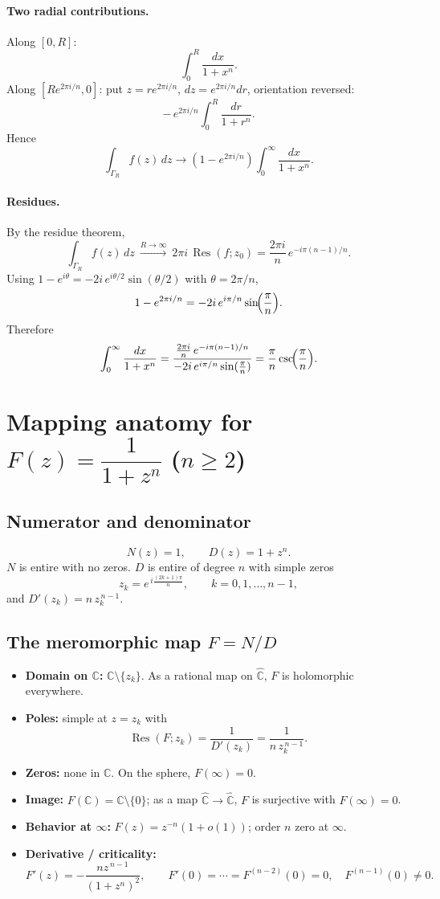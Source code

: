 \documentclass[12pt,a4paper]{article}
\newcommand{\C}{\mathbb{C}}
\begin{document}
\paragraph{Two radial contributions.}
Along \([0,R]\):
\[
\int_{0}^{R}\frac{dx}{1+x^{n}}.
\]
Along \([Re^{2\pi i/n},0]\): put \(z=re^{2\pi i/n}\), \(dz=e^{2\pi i/n}dr\), orientation reversed:
\[
-\,e^{2\pi i/n}\int_{0}^{R}\frac{dr}{1+r^{n}}.
\]
Hence
\[
\int_{\Gamma_R} f(z)\,dz
\longrightarrow (1-e^{2\pi i/n})\int_{0}^{\infty}\frac{dx}{1+x^{n}}.
\]

\paragraph{Residues.}
By the residue theorem,
\[
\int_{\Gamma_R} f(z)\,dz \ \xrightarrow{R\to\infty}\ 2\pi i\,\operatorname{Res}(f;z_0)
=\frac{2\pi i}{n}\,e^{-i\pi(n-1)/n}.
\]
Using \(1-e^{i\theta}=-2i\,e^{i\theta/2}\sin(\theta/2)\) with \(\theta=2\pi/n\),
\[
1-e^{2\pi i/n}=-2i\,e^{i\pi/n}\sin\!\Bigl(\frac{\pi}{n}\Bigr).
\]
Therefore
\[
\int_{0}^{\infty}\frac{dx}{1+x^{n}}
=\frac{ \frac{2\pi i}{n}\,e^{-i\pi(n-1)/n} }
{ -2i\,e^{i\pi/n}\sin(\frac{\pi}{n}) }
=\frac{\pi}{n}\csc\!\Bigl(\frac{\pi}{n}\Bigr).
\]

\section*{Mapping anatomy for \(F(z)=\dfrac{1}{1+z^{n}}\) (\(n\ge 2\))}

\subsection*{Numerator and denominator}
\[
N(z)=1,\qquad D(z)=1+z^{n}.
\]
\(N\) is entire with no zeros. \(D\) is entire of degree \(n\) with simple zeros
\[
z_k=e^{\,i\frac{(2k+1)\pi}{n}},\qquad k=0,1,\dots,n-1,
\]
and \(D'(z_k)=n\,z_k^{\,n-1}\).

\subsection*{The meromorphic map \(F=N/D\)}
\begin{itemize}
	\item \textbf{Domain on \(\C\):} \(\C\setminus\{z_k\}\). As a rational map on \(\widehat{\C}\), \(F\) is holomorphic everywhere.
	\item \textbf{Poles:} simple at \(z=z_k\) with
	\[
	\operatorname{Res}\!\left(F;z_k\right)=\frac{1}{D'(z_k)}=\frac{1}{n\,z_k^{\,n-1}}.
	\]
	\item \textbf{Zeros:} none in \(\C\). On the sphere, \(F(\infty)=0\).
	\item \textbf{Image:} \(F(\C)=\C\setminus\{0\}\); as a map \(\widehat{\C}\to\widehat{\C}\), \(F\) is surjective with \(F(\infty)=0\).
	\item \textbf{Behavior at \(\infty\):} \(F(z)=z^{-n}(1+o(1))\); order \(n\) zero at \(\infty\).
	\item \textbf{Derivative / criticality:}
	\[
	F'(z)=-\frac{n z^{\,n-1}}{(1+z^{n})^{2}},\qquad
	F'(0)=\cdots=F^{(n-2)}(0)=0,\quad F^{(n-1)}(0)\ne 0.
	\]
\end{itemize}
\end{document}
